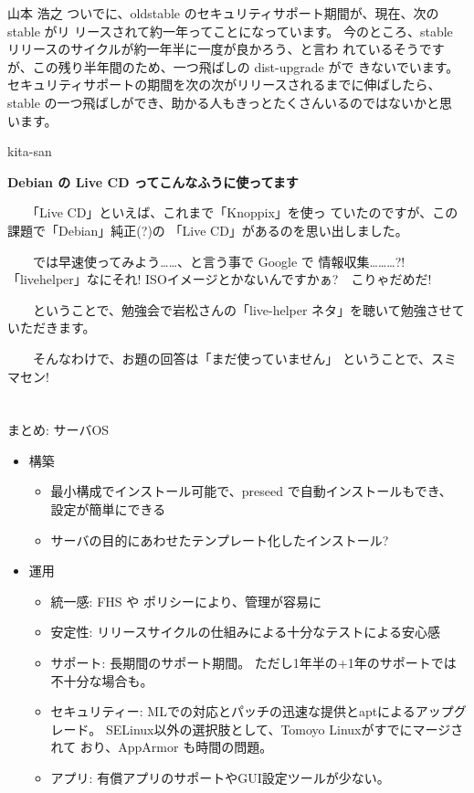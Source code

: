 \documentclass[cjk,dvipdfmx,12pt]{beamer}
\begin{document}
\begin{frame}{山本 浩之}
ついでに、oldstable のセキュリティサポート期間が、現在、次の stable がリ
リースされて約一年ってことになっています。
今のところ、stable リリースのサイクルが約一年半に一度が良かろう、と言わ
れているそうですが、この残り半年間のため、一つ飛ばしの dist-upgrade がで
きないでいます。
セキュリティサポートの期間を次の次がリリースされるまでに伸ばしたら、
stable の一つ飛ばしができ、助かる人もきっとたくさんいるのではないかと思
います。

\end{frame}\begin{frame}{kita-san}

\textbf{Debian の Live CD ってこんなふうに使ってます}

　　「Live CD」といえば、これまで「Knoppix」を使っ
ていたのですが、この課題で「Debian」純正(?)の
「Live CD」があるのを思い出しました。

　　では早速使ってみよう……、と言う事で Google で
情報収集………?!　「livehelper」なにそれ!
ISOイメージとかないんですかぁ?　こりゃだめだ!

　　ということで、勉強会で岩松さんの「live-helper
ネタ」を聴いて勉強させていただきます。

　　そんなわけで、お題の回答は「まだ使っていません」
ということで、スミマセン!

\end{frame}

\section{}
\begin{frame}{まとめ: サーバOS}

\begin{itemize}
 \item 構築
\begin{itemize}
 \item 最小構成でインストール可能で、preseed で自動インストールもでき、
       設定が簡単にできる
 \item サーバの目的にあわせたテンプレート化したインストール?
\end{itemize}
 \item 運用
\begin{itemize}
 \item 統一感:
       FHS や ポリシーにより、管理が容易に
 \item 安定性:
       リリースサイクルの仕組みによる十分なテストによる安心感
 \item サポート:
       長期間のサポート期間。
       ただし1年半の+1年のサポートでは不十分な場合も。
 \item セキュリティー:
       MLでの対応とパッチの迅速な提供とaptによるアップグレード。
       SELinux以外の選択肢として、Tomoyo Linuxがすでにマージされて
       おり、AppArmor も時間の問題。
 \item アプリ: 有償アプリのサポートやGUI設定ツールが少ない。

 \end{itemize}
\end{itemize}
\end{frame}
\end{document}
